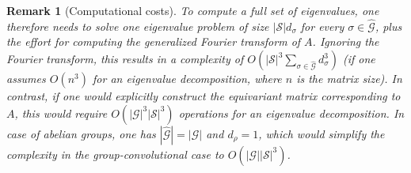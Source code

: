 \documentclass[preprint,12pt,authoryear]{elsarticle}
\newcommand{\Fourier}[1]{\widehat{#1}}
\newcommand\Gc{\mathcal G}
\newcommand\Sc{\mathcal S}
\newtheorem{remark}{Remark}%
\begin{document}
{\begin{remark}[Computational costs]
    To compute a full set of eigenvalues, one therefore needs to solve one eigenvalue problem of size $|\Sc|d_\sigma$ for every $\sigma \in \Fourier{\Gc}$, plus the effort for computing the generalized Fourier transform of $A$. Ignoring the Fourier transform, this results in a complexity of $O(|\Sc|^3 \sum_{\sigma \in \Fourier{\Gc}} d_\sigma^3)$ (if one assumes $O(n^3)$ for an eigenvalue decomposition, where $n$ is the matrix size). In contrast, if one would explicitly construct the equivariant matrix corresponding to $A$, this would require $O(|\Gc|^3|\Sc|^3)$ operations for an eigenvalue decomposition. In case of abelian groups, one has $|\Fourier{\Gc}| = |\Gc|$ and $d_\rho = 1$, which would simplify the complexity in the group-convolutional case to $O(|\Gc||\Sc|^3)$.
\end{remark}

}
\end{document}
